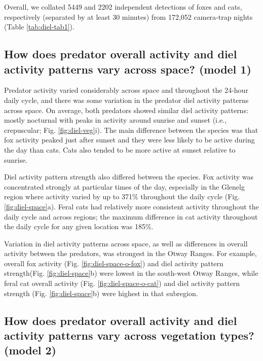 \documentclass[11pt,a4paper,titlepage,twoside,openright]{style/unimelbthesis}
\begin{document}
\begin{mainmatter}
Overall, we collated 5449 and 2202 independent detections of foxes and cats, respectively (separated by at least 30 minutes) from 172,052 camera-trap nights (Table \ref{tab:diel-tab1}).

\hypertarget{how-does-predator-overall-activity-and-diel-activity-patterns-vary-across-space-model-1-1}{%
\subsection{How does predator overall activity and diel activity patterns vary across space? (model 1)}\label{how-does-predator-overall-activity-and-diel-activity-patterns-vary-across-space-model-1-1}}

Predator activity varied considerably across space and throughout the 24-hour daily cycle, and there was some variation in the predator diel activity patterns across space. On average, both predators showed similar diel activity patterns: mostly nocturnal with peaks in activity around sunrise and sunset (i.e., crepuscular; Fig. \ref{fig:diel-veg}i). The main difference between the species was that fox activity peaked just after sunset and they were less likely to be active during the day than cats. Cats also tended to be more active at sunset relative to sunrise.

Diel activity pattern strength also differed between the species. Fox activity was concentrated strongly at particular times of the day, especially in the Glenelg region where activity varied by up to 371\% throughout the daily cycle (Fig. \ref{fig:diel-space}a). Feral cats had relatively more consistent activity throughout the daily cycle and across regions; the maximum difference in cat activity throughout the daily cycle for any given location was 185\%.

Variation in diel activity patterns across space, as well as differences in overall activity between the predators, was strongest in the Otway Ranges. For example, overall fox activity (Fig. \ref{fig:diel-space-o-fox}) and diel activity pattern strength(Fig. \ref{fig:diel-space}b) were lowest in the south-west Otway Ranges, while feral cat overall activity (Fig. \ref{fig:diel-space-o-cat}) and diel activity pattern strength (Fig. \ref{fig:diel-space}b) were highest in that subregion.

\hypertarget{how-does-predator-overall-activity-and-diel-activity-patterns-vary-across-vegetation-types-model-2-1}{%
\subsection{How does predator overall activity and diel activity patterns vary across vegetation types? (model 2)}\label{how-does-predator-overall-activity-and-diel-activity-patterns-vary-across-vegetation-types-model-2-1}}


\end{mainmatter}
\end{document}
